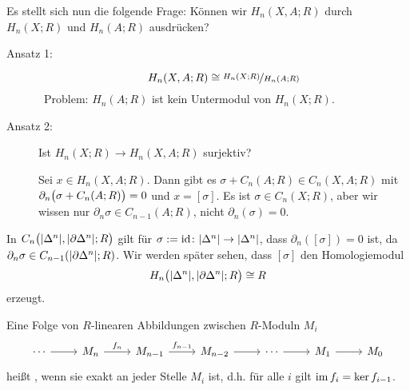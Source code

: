 Es stellt sich nun die folgende Frage:
Können wir $H_n(X,A;R)$ durch $H_n(X;R)$ und $H_n(A;R)$ ausdrücken? 
\begin{description}
	\item[Ansatz 1:] 
	\[
		H_n(X,A;R) \cong \nicefrac{H_n(X;R)}{H_n(A;R)}
	\]
	\faWarning \, Problem: $H_n(A;R)$ ist kein Untermodul von $H_n(X;R)$.
	\item[Ansatz 2:] Ist $H_n(X;R) \to H_n(X,A;R)$ surjektiv?
	
	Sei $x \in H_n(X,A;R)$. Dann gibt es $\sigma + C_n(A;R) \in C_n(X,A;R)$ mit $\partial_n \enbrace[\big]{\sigma + C_n(A;R)} = 0$ und $x= [\sigma]$. Es ist 
	$\sigma \in C_n(X;R)$, aber wir wissen nur $\partial_n \sigma \in C_{n-1}(A;R)$, nicht $\partial_n(\sigma)= 0$. \hfill {\large \faMehO}
\end{description}

\begin{beispiel}[{name=[{Homologie des Paares $(\abs*{\Delta^n}, \abs*{\partial \Delta^n})$}]}]
	In $C_n \enbrace[\big]{\abs*{\Delta^n}, \abs*{\partial \Delta^n};R}$ gilt für $\sigma := \id \colon \abs*{\Delta^n} \to \abs*{\Delta^n}$, dass $\partial_n([\sigma])=0$ ist, da 
	$\partial_n \sigma \in C_{n-1} \enbrace*{\abs*{\partial \Delta^n};R}$. Wir werden später sehen, dass $[\sigma]$ den Homologiemodul
	\[
		H_n \enbrace[\big]{\abs*{\Delta^n}, \abs*{\partial \Delta^n};R  } \cong R 
	\]
	erzeugt.
\end{beispiel}

\begin{definition}[{name=[{Lange exakte Sequenz von $R$-Moduln}]}]
	Eine Folge von $R$-linearen Abbildungen zwischen $R$-Moduln $M_i$
	\[
		\begin{tikzcd}
			\cdots \rar & M_n \rar["f_n"]  & M_{n-1} \rar["f_{n-1}"] & M_{n-2} \rar & \cdots \rar & M_1 \rar & M_0
		\end{tikzcd}
	\]
	heißt , wenn sie exakt an jeder Stelle $M_i$ ist, d.h. für alle $i$ gilt $\im f_i = \ker f_{i-1}$.
\end{definition}

